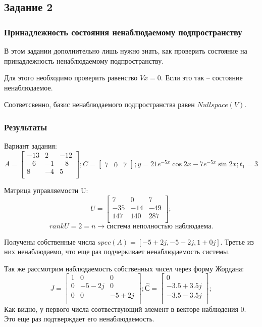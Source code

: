 \subsection{Задание 2}
\subsubsection{Принадлежность состояния ненаблюдаемому подпространству}
В этом задании дополнительно лишь нужно знать, как проверить состояние на принадлежность ненаблюдаемому подпространству.

Для этого необходимо проверить равенство \(Vx = 0\). Если это так -- состояние ненаблюдаемое.

Соответсвенно, базис ненаблюдаемого подпространства равен \(Nullspace(V)\).


\subsubsection{Результаты}
Вариант задания:
\[ A = \begin{bmatrix}
        -13 & 2 & -12 \\
        -6 & -1 & -8 \\
        8 & -4 & 5 \\
        \end{bmatrix}; 
        C = \begin{bmatrix}
                7 & 0 & 7
                \end{bmatrix}; 
        y = 21 e^{-5x}\cos{2x} - 7 e^{-5x}\sin{2x}; 
        t_1 = 3
\]

Матрица управляемости U:
\[ U = \begin{bmatrix}
        7 & 0 & 7 \\
        -35 & -14 & -49 \\
        147 & 140 & 287 \\
        \end{bmatrix};
\]
\[rankU = 2 = n \rightarrow \text{система  неполностью наблюдаема.}\]

Получены собственные числа \(spec(A) = [-5+2j, -5 -2j, 1+0j]\). Третье из них ненаблюдаемо, что еще раз подчеркивает ненаблюдаемость системы.

Так же рассмотрим наблюдаемость собственных чисел через форму Жордана:
\[
        J = \begin{bmatrix}
                1 & 0 & 0 \\
                0 & -5 - 2j & 0 \\
                0 & 0 & -5 + 2j \\
                \end{bmatrix};
        \hat{С} = \begin{bmatrix}
                0 \\
                -3.5 + 3.5j \\
                -3.5 - 3.5j \\
                \end{bmatrix};
\]
Как видно, у первого числа соотвествующий элемент в векторе наблюдения 0. Это еще раз подтверждает его ненаблюдаемость.

